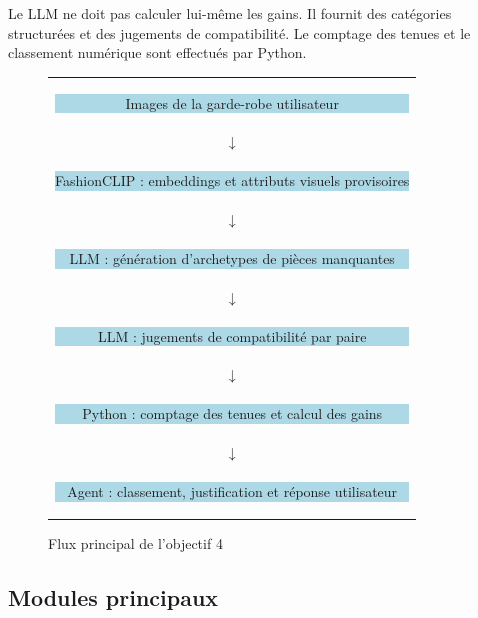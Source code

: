 \documentclass[11pt,a4paper]{article}
\begin{document}
Le LLM ne doit pas calculer lui-même les gains. Il fournit des catégories
structurées et des jugements de compatibilité. Le comptage des tenues et le
classement numérique sont effectués par Python.

\begin{figure}[H]
\centering
\begin{tabular}{c}
\colorbox{lightblue}{\parbox{0.75\textwidth}{\centering
Images de la garde-robe utilisateur}} \\[0.2cm]
$\downarrow$ \\[0.2cm]
\colorbox{lightblue}{\parbox{0.75\textwidth}{\centering
FashionCLIP : embeddings et attributs visuels provisoires}} \\[0.2cm]
$\downarrow$ \\[0.2cm]
\colorbox{lightblue}{\parbox{0.75\textwidth}{\centering
LLM : génération d'archetypes de pièces manquantes}} \\[0.2cm]
$\downarrow$ \\[0.2cm]
\colorbox{lightblue}{\parbox{0.75\textwidth}{\centering
LLM : jugements de compatibilité par paire}} \\[0.2cm]
$\downarrow$ \\[0.2cm]
\colorbox{lightblue}{\parbox{0.75\textwidth}{\centering
Python : comptage des tenues et calcul des gains}} \\[0.2cm]
$\downarrow$ \\[0.2cm]
\colorbox{lightblue}{\parbox{0.75\textwidth}{\centering
Agent : classement, justification et réponse utilisateur}}
\end{tabular}
\caption{Flux principal de l'objectif 4}
\end{figure}

\subsection{Modules principaux}
\end{document}
